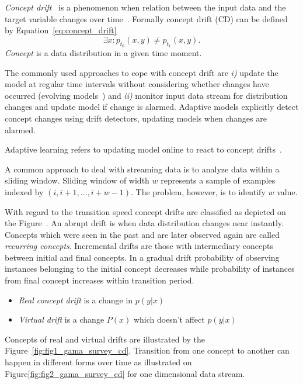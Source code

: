 \documentclass[doctoral,utf8,lot,loar,lof,shortloft,index]{jydiss}
\begin{document}
\textit{Concept drift}~\cite{Widmer1996,schlimmer1986incremental,gama2014survey} is a
phenomenon when relation between the input data and the target variable changes
over time~\cite{gama2014survey}. 
%
Formally concept drift (CD) can be defined~\cite{gama2014survey} by
Equation~\ref{eq:concept_drift}
\begin{equation}\label{eq:concept_drift}
    \exists x: p_{t_0}(x,y) \neq  p_{t_1}(x,y).
\end{equation}
\textit{Concept} is a data distribution in a given time moment.

The commonly used approaches to cope with concept drift are \textit{i)} update the model at regular time intervals without considering whether changes have occurred (evolving models~\cite{SouzaChallenges2020}) and \textit{ii)} monitor input data stream for distribution changes and update model if change is alarmed. Adaptive models explicitly detect concept changes using drift detectors, updating models when changes are alarmed.  

Adaptive learning refers to updating model online to react to concept drifts~\cite{gama2014survey}.

A common approach to deal with streaming data is to analyze data within a sliding window. 
Sliding window of width $w$ represents a sample of examples indexed by $(i, i+1, \dots, i+w-1)$. 
The problem, however, is to identify $w$ value.

With regard to the transition speed concept drifts are classified as depicted on the Figure~\cite{fig:souza_cd_speeds}.
An abrupt drift is when data distribution changes near instantly.
Concepts which were seen in the past and are later observed again are called \textit{recurring concepts}.
Incremental drifts are those with intermediary concepts between initial and final concepts.
In a gradual drift probability of observing instances belonging to the initial concept decreases while probability of instances from final concept increases within transition period.

\begin{itemize}
  \item \textit{Real concept drift}\cite{gama2014survey,gao2007general, salganicoff1997tolerating} is a change in $p(y|x)$
  \item \textit{Virtual drift}\cite{delany2004case,tsymbal2004problem,widmer1993effective} is a change $P(x)$ which doesn't affect $p(y|x)$
\end{itemize}

Concepts of real and virtual drifts are illustrated by the Figure~\ref{fig:fig1_gama_survey_cd}.
Transition from one concept to another can happen in different forms over time as illustrated on Figure\ref{fig:fig2_gama_survey_cd} for one dimensional data stream.  
~\cite{karkkainen2014region}
\end{document}
